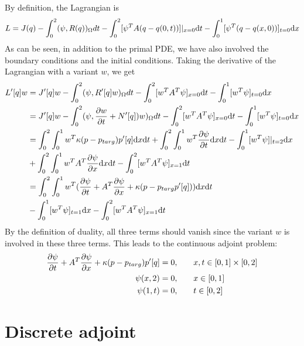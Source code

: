 \documentclass[a4paper]{article}
\begin{document}
By definition, the Lagrangian is 
\begin{equation}
\begin{aligned}
L &= J(q) - \int_{0}^{2}(\psi, R(q))_{\Omega}dt - \int_{0}^{2}[\psi^TA (q-q(0,t))]|_{x=0}\mathrm{d} t - \int_{0}^{1}[\psi^T(q - q(x,0))]_{t=0}\mathrm{d} x\\
\end{aligned}
\end{equation}
As can be seen, in addition to the primal PDE, we have also involved the boundary conditions and the initial conditions.
Taking the derivative of the Lagrangian with a variant $w$, we get
\begin{equation}
\begin{aligned}
L'[q]w &= J'[q]w - \int_{0}^{2}(\psi, R'[q]w)_{\Omega} dt - \int_{0}^{2}[w^TA^T\psi]_{x=0}\mathrm{d} t - \int_{0}^{1}[w^T\psi]_{t=0}\mathrm{d} x\\
&= J'[q]w - \int_{0}^{2}(\psi, \frac{\partial {w}}{\partial{t}} + N'[q])w)_{\Omega} dt - \int_{0}^{2}[w^TA^T\psi]_{x=0}\mathrm{d} t - \int_{0}^{1}[w^T\psi]_{t=0}\mathrm{d} x\\
&=  \int_{0}^{2}\int_{0}^{1}w^T \kappa(p-p_{targ})p'[q]\mathrm{d} x\mathrm{d} t + \int_{0}^{2}\int_{0}^{1}w^T \frac{\partial {\psi}}{\partial{t}}\mathrm{d} x\mathrm{d} t - \int_{0}^{1}[w^T\psi]|_{t=2}\mathrm{d} x \\
&+ \int_{0}^{2} \int_{0}^{1}w^T A^T\frac{\partial {\psi}}{\partial{x}}\mathrm{d} x\mathrm{d} t - \int_{0}^{2} [w^TA^T \psi]_{x=1}\mathrm{d} t\\
&= \int_{0}^{2}\int_{0}^{1} w^T(\frac{\partial {\psi}}{\partial{t}} + A^T\frac{\partial {\psi}}{\partial{x}} + \kappa(p-p_{targ}p'[q]))\mathrm{d} x \mathrm{d} t \\
&-\int_{0}^{1}[w^T\psi]_{t=1}\mathrm{d} x
- \int_{0}^{2} [w^TA^T \psi]_{x=1}\mathrm{d} t \\
\end{aligned}
\end{equation}
By the definition of duality, all three terms should vanish since the variant $w$ is involved in these three terms. This leads to the continuous adjoint problem:\
\begin{equation}\label{eq:con_adj}
\begin{aligned}
\frac{\partial {\psi}}{\partial{t}}+A^T\frac{\partial {\psi}}{\partial{x}} + \kappa(p-p_{targ})p'[q] &= 0, \quad &&x,t\in [0,1]\times [0,2] \\
\psi(x,2) &= 0, \quad &&x\in [0,1]\\
\psi(1,t) &= 0, \quad &&t\in [0,2]
\end{aligned}
\end{equation}

\section{Discrete adjoint}
\end{document}
